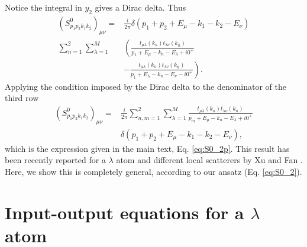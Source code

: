 \documentclass[notitlepage, prx, preprint, amsmath,superscriptaddress,amssymb]{revtex4-1}
\begin{document}
Notice the integral in $y_2$ gives a Dirac delta. Thus
\begin{align}
(S_{p_1p_2k_1k_2}^0)_{\mu\nu}=&\frac{i}{2\pi} \delta(p_1+p_2+E_\mu-k_1-k_2-E_\nu) \nonumber\\
\sum_{n=1}^2 \sum_{\lambda=1}^M& \left( \frac{t_{\mu\lambda}(k_n)t_{\lambda\nu}(k_{\overline{n}})}{p_1+E_\mu-k_n-E_\lambda+i0^+} \right. \nonumber\\
&\left. -\frac{t_{\mu\lambda}(k_n)t_{\lambda\nu}(k_{\overline{n}})}{p_1+E_\lambda-k_n-E_\nu-i0^+}\right).
\end{align}
Applying the condition imposed by the Dirac delta to the denominator of the third row
\begin{align}
(S_{p_1p_2k_1k_2}^0)_{\mu\nu}=  &\frac{i}{2\pi}\sum_{n,m=1}^2 \sum_{\lambda=1}^M  \frac{t_{\mu\lambda}(k_n) t_{\lambda\nu}(k_{\overline{n}})}{p_m+E_\mu -k_n -E_\lambda + i0^+}\nonumber\\
&\delta(p_1+p_2+E_\mu - k_1-k_2-E_\nu),
\end{align}
which is the expression given in the main text, Eq. \eqref{eq:S0_2p}. This result has been recently reported for a $\lambda$ atom and different local scatterers by Xu and Fan \cite{Xu2016}. Here, we show this is completely general, according to our ansatz (Eq. \eqref{eq:S0_2}).



\section{Input-output equations for a $\lambda$ atom}
\end{document}
